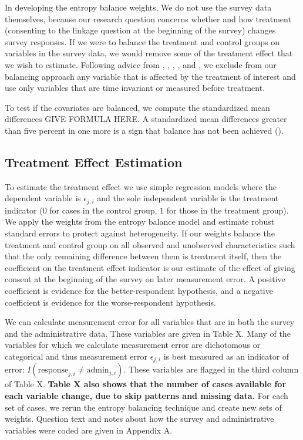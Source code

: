 In developing the entropy balance weights, We do not use the survey data themselves, because our research question concerns whether and how treatment (consenting to the linkage question at the beginning of the survey) changes survey responses. If we were to balance the treatment and control groups on variables in the survey data, we would remove some of the treatment effect that we wish to estimate. Following advice from \cite{Rosenbaum84}, \cite{Frangakisetal02}, \cite{Greenland03}, \cite{Caliendoetal08}, and \cite{Stuart10}, we exclude from our balancing approach any variable that is affected by the treatment of interest and use only variables that are time invariant or measured before treatment. 



To test if the covariates are balanced, we compute the standardized mean differences GIVE FORMULA HERE. A standardized mean differences greater than five percent in one more is a sign that balance has not been achieved (\cite{Caliendoetal08}). 

\subsection{Treatment Effect Estimation}

To estimate the treatment effect we use simple regression models where the dependent variable is $\epsilon_{j,i}$ and the sole independent variable is the treatment indicator ($0$ for cases in the control group, $1$ for those in the treatment group). We apply the weights from the entropy balance model and estimate robust standard errors to protect against heterogeneity. If our weights balance the treatment and control group on all observed and unobserved characteristics such that the only remaining difference between them is treatment itself, then the coefficient on the treatment effect indicator is our estimate of the effect of giving consent at the beginning of the survey on later measurement error. A positive coefficient is evidence for the better-respondent hypothesis, and a negative coefficient is evidence for the worse-respondent hypothesis.

We can calculate measurement error for all variables that are in both the survey and the administrative data. These variables are given in Table X.  Many of the variables for which we calculate measurement error are dichotomous or categorical and thus measurement error $\epsilon_{j,i}$ is best measured as an indicator of error: $I(\text{response}_{j,i} \neq \text{admin}_{j,i})$. These variables are flagged in the third column of Table X. \textbf{Table X also shows that the number of cases available for each variable change, due to skip patterns and missing data.} For each set of cases, we rerun the entropy balancing technique and create new sets of weights. Question text and notes about how the survey and administrative variables were coded are given in Appendix A.


